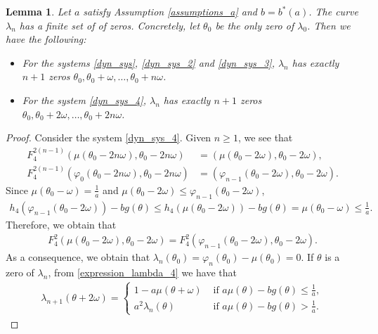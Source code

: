 \documentclass[12pt]{article}
\theoremstyle{plain}
\newtheorem{lemma}[defn]{Lemma}
\theoremstyle{remark}
\theoremstyle{definition}
\begin{document}
\begin{lemma}\label{zeros_lambda}
    Let $a$ satisfy Assumption \eqref{assumptions_a} and $b = b^*(a)$. The curve $\lambda_n$ has a finite set of of zeros. Concretely, let $\theta_0$ be the only zero of $\lambda_0$. Then we have the following:
    \begin{itemize}
        \item For the systems \eqref{dyn_sys}, \eqref{dyn_sys_2} and \eqref{dyn_sys_3}, $\lambda_n$ has exactly $n+1$ zeros $\theta_0,\theta_0+\omega,\dots,\theta_0+n\omega$.
        \item For the system \eqref{dyn_sys_4}, $\lambda_n$ has exactly $n+1$ zeros $\theta_0,\theta_0+2\omega,\dots,\theta_0+2n\omega$.
    \end{itemize}
\end{lemma}
\begin{proof}
    Consider the system \eqref{dyn_sys_4}.
    Given $n\geq 1$, we see that
    \begin{align*}
        F_{4}^{2(n-1)}(\mu(\theta_0-2n\omega),\theta_0-2n\omega) &= (\mu(\theta_0-2\omega),\theta_0-2\omega),\\
        F_{4}^{2(n-1)}(\varphi_0(\theta_0-2n\omega),\theta_0-2n\omega) &= (\varphi_{n-1}(\theta_0-2\omega),\theta_0-2\omega).
    \end{align*}
    Since $\mu(\theta_0-\omega)=\frac{1}{a}$ and $\mu(\theta_0-2\omega)\leq \varphi_{n-1}(\theta_0-2\omega)$,
    \begin{align*}
        h_4(\varphi_{n-1}(\theta_0-2\omega))-b g(\theta)\leq h_4(\mu(\theta_0-2\omega))-b g(\theta) = \mu(\theta_0-\omega) \leq \frac{1}{a}.
    \end{align*}
    Therefore, we obtain that
    \begin{align*}
        F_{4}^2(\mu(\theta_0-2\omega),\theta_0-2\omega) = F_{4}^2(\varphi_{n-1}(\theta_0-2\omega),\theta_0-2\omega).
    \end{align*}
    As a consequence, we obtain that $\lambda_n(\theta_0)=\varphi_n(\theta_0)-\mu(\theta_0)=0$. If $\theta$ is a zero of $\lambda_n$, from \eqref{expression_lambda_4} we have that
    \begin{align*}
        \lambda_{n+1}(\theta+2\omega) = 
        \begin{cases}
            1 - a\mu(\theta+\omega) &\text{ if }a\mu(\theta) - b g(\theta)\leq\frac{1}{a},\\
            a^2\lambda_n(\theta) &\text{ if }a\mu(\theta) - b g(\theta)>\frac{1}{a}.
        \end{cases}

\end{align*}
\end{proof}
\end{document}
